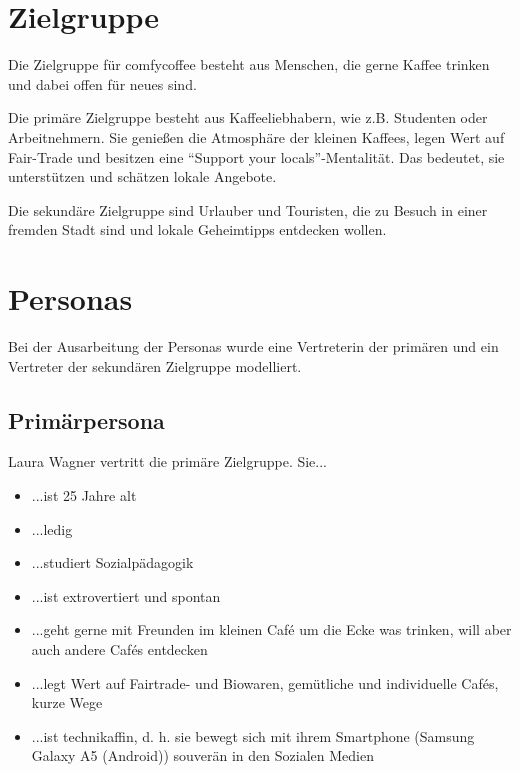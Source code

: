 \section{Zielgruppe}
Die Zielgruppe für comfycoffee besteht aus Menschen, die gerne Kaffee trinken und dabei offen für neues sind.

Die primäre Zielgruppe besteht aus Kaffeeliebhabern, wie z.B. Studenten oder Arbeitnehmern. Sie genießen die Atmosphäre der kleinen Kaffees, legen Wert auf Fair-Trade und besitzen eine ``Support your locals''-Mentalität. Das bedeutet, sie unterstützen und schätzen lokale Angebote.

Die sekundäre Zielgruppe sind Urlauber und Touristen, die zu Besuch in einer fremden Stadt sind und lokale Geheimtipps entdecken wollen.

\section{Personas}
Bei der Ausarbeitung der Personas wurde eine Vertreterin der primären und ein Vertreter der sekundären Zielgruppe modelliert.

\subsection{Primärpersona}
Laura Wagner vertritt die primäre Zielgruppe. Sie...
\begin{itemize}
	\item ...ist 25 Jahre alt
	\item ...ledig
	\item ...studiert Sozialpädagogik
	\item ...ist extrovertiert und spontan
	\item ...geht gerne mit Freunden im kleinen Café um die Ecke was trinken, will aber auch andere Cafés entdecken
	\item ...legt Wert auf Fairtrade- und Biowaren, gemütliche und individuelle Cafés, kurze Wege
	\item ...ist technikaffin, d. h. sie bewegt sich mit ihrem Smartphone (Samsung Galaxy A5 (Android)) souverän in den Sozialen Medien
\end{itemize}

